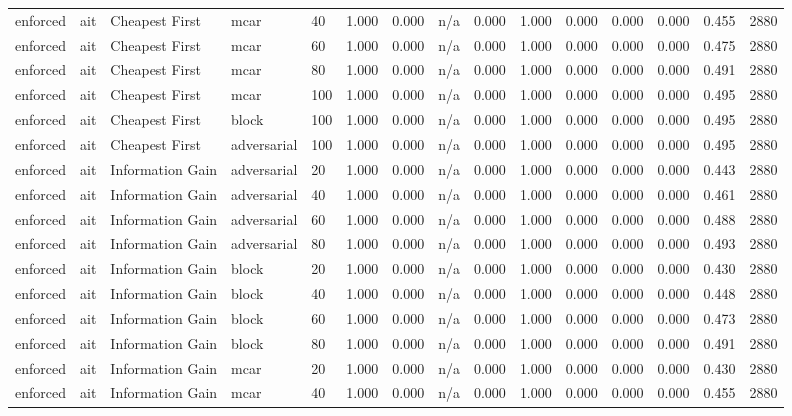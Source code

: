 \begin{table}[!ht]
{\begin{tabular}{lllllllllllllll}
enforced & ait & Cheapest First & mcar & 40 & 1.000 & 0.000 & n/a & 0.000 & 1.000 & 0.000 & 0.000 & 0.000 & 0.455 & 2880 \\
enforced & ait & Cheapest First & mcar & 60 & 1.000 & 0.000 & n/a & 0.000 & 1.000 & 0.000 & 0.000 & 0.000 & 0.475 & 2880 \\
enforced & ait & Cheapest First & mcar & 80 & 1.000 & 0.000 & n/a & 0.000 & 1.000 & 0.000 & 0.000 & 0.000 & 0.491 & 2880 \\
enforced & ait & Cheapest First & mcar & 100 & 1.000 & 0.000 & n/a & 0.000 & 1.000 & 0.000 & 0.000 & 0.000 & 0.495 & 2880 \\
enforced & ait & Cheapest First & block & 100 & 1.000 & 0.000 & n/a & 0.000 & 1.000 & 0.000 & 0.000 & 0.000 & 0.495 & 2880 \\
enforced & ait & Cheapest First & adversarial & 100 & 1.000 & 0.000 & n/a & 0.000 & 1.000 & 0.000 & 0.000 & 0.000 & 0.495 & 2880 \\
enforced & ait & Information Gain & adversarial & 20 & 1.000 & 0.000 & n/a & 0.000 & 1.000 & 0.000 & 0.000 & 0.000 & 0.443 & 2880 \\
enforced & ait & Information Gain & adversarial & 40 & 1.000 & 0.000 & n/a & 0.000 & 1.000 & 0.000 & 0.000 & 0.000 & 0.461 & 2880 \\
enforced & ait & Information Gain & adversarial & 60 & 1.000 & 0.000 & n/a & 0.000 & 1.000 & 0.000 & 0.000 & 0.000 & 0.488 & 2880 \\
enforced & ait & Information Gain & adversarial & 80 & 1.000 & 0.000 & n/a & 0.000 & 1.000 & 0.000 & 0.000 & 0.000 & 0.493 & 2880 \\
enforced & ait & Information Gain & block & 20 & 1.000 & 0.000 & n/a & 0.000 & 1.000 & 0.000 & 0.000 & 0.000 & 0.430 & 2880 \\
enforced & ait & Information Gain & block & 40 & 1.000 & 0.000 & n/a & 0.000 & 1.000 & 0.000 & 0.000 & 0.000 & 0.448 & 2880 \\
enforced & ait & Information Gain & block & 60 & 1.000 & 0.000 & n/a & 0.000 & 1.000 & 0.000 & 0.000 & 0.000 & 0.473 & 2880 \\
enforced & ait & Information Gain & block & 80 & 1.000 & 0.000 & n/a & 0.000 & 1.000 & 0.000 & 0.000 & 0.000 & 0.491 & 2880 \\
enforced & ait & Information Gain & mcar & 20 & 1.000 & 0.000 & n/a & 0.000 & 1.000 & 0.000 & 0.000 & 0.000 & 0.430 & 2880 \\
enforced & ait & Information Gain & mcar & 40 & 1.000 & 0.000 & n/a & 0.000 & 1.000 & 0.000 & 0.000 & 0.000 & 0.455 & 2880 \\

\end{tabular}}
\end{table}
